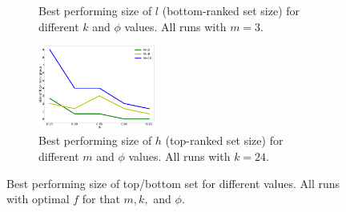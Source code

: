 \documentclass[letterpaper]{article} %
\begin{document}
\begin{figure}
\begin{subfigure}{0.24\textwidth}
\caption{Best performing size of $l$ (bottom-ranked set size) for different $k$ and $\phi$ values. All runs with $m = 3$.}
\label{fig:percentage_of_low_rank_group_for_num_of_reviews}
\end{subfigure}
\hfill
\begin{subfigure}{0.24\textwidth}
\includegraphics[width=\textwidth,height=1.089in ]{"./images/size_of_high_rank_group_for_num_of_winners_with_phi_new_new.png"}
\caption{Best performing size of $h$ (top-ranked set size) for different $m$ and $\phi$ values. All runs with $k = 24$.}
\label{fig:size_of_high_rank_group_for_num_of_winners}
\end{subfigure}
\label{fig:third}
\caption{Best performing size of top/bottom set for different values. All runs with optimal $f$ for that $m, k,$ and $\phi$.}
\end{figure}
\end{document}
